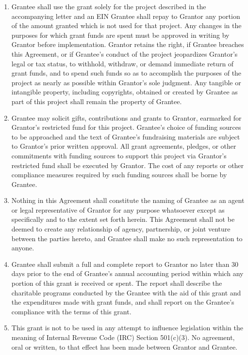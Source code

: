 \documentclass[english,letterpaper,12pt]{article}
\begin{document}
\begin{enumerate}
\item Grantee shall use the grant solely for the project described in the accompanying letter and an EIN Grantee shall repay to Grantor any portion of the amount granted which is not used for that project.   Any changes in the purposes for which grant funds are spent must be approved in writing by Grantor before implementation.  Grantor retains the right, if Grantee breaches this Agreement, or if Grantee's conduct of the project jeopardizes Grantor's legal or tax status, to withhold, withdraw, or demand immediate return of grant funds, and to spend such funds so as to accomplish the purposes of the project as nearly as possible within Grantor's sole judgment.  Any tangible or intangible property, including copyrights, obtained or created by Grantee as part of this project shall remain the property of Grantee.

\item Grantee may solicit gifts, contributions and grants to Grantor, earmarked for Grantor's restricted fund for this project. Grantee's choice of funding sources to be approached and the text of Grantee's fundraising materials are subject to Grantor's prior written approval. All grant agreements, pledges, or other commitments with funding sources to support this project via Grantor's restricted fund shall be executed by Grantor. The cost of any reports or other compliance measures required by such funding sources shall be borne by Grantee.

\item Nothing in this Agreement shall constitute the naming of Grantee as an agent or legal representative of Grantor for any purpose whatsoever except as specifically and to the extent set forth herein. This Agreement shall not be deemed to create any relationship of agency, partnership, or joint venture between the parties hereto, and Grantee shall make no such representation to anyone. 

\item Grantee shall submit a full and complete report to Grantor no later than 30 days prior to the end of Grantee's annual accounting period within which any portion of this grant is received or spent.  The report shall describe the charitable programs conducted by the Grantee with the aid of this grant and the expenditures made with grant funds, and shall report on the Grantee's compliance with the terms of this grant.

\item This grant is not to be used in any attempt to influence legislation within the meaning of Internal Revenue Code (IRC) Section 501(c)(3). No agreement, oral or written, to that effect has been made between Grantor and Grantee.


\end{enumerate}
\end{document}
